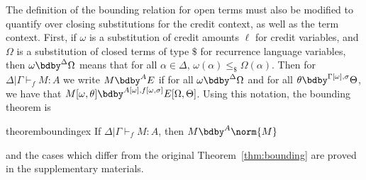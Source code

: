 The definition of the bounding relation for open terms must also be modified to quantify over closing substitutions for the credit context, as well as the term context.
First, if $\omega$ is a substitution of credit amounts $\ell$ for credit variables, and $\Omega$ is a substitution of closed terms of type $\$$ for recurrence language variables, then $\omega \bdby^{\Delta} \Omega$ means that for all $\alpha \in \Delta$, $\omega(\alpha) \leq_\$ \Omega(\alpha)$.
Then for $\Delta | \Gamma \vdash_f M : A$ we write $M \bdby^A E$ if for all $\omega \bdby^{\Delta} \Omega$ and for all $\theta \bdby^{\Gamma[\omega],\sigma} \Theta$, we have that $M[\omega,\theta] \bdby^{A[\omega],f[\omega,\sigma]} E[\Omega,\Theta]$.
Using this notation, the bounding theorem is
\begin{restatable}{theorem}{boundingex}
\label{thm:bounding-ex}
If $\Delta | \Gamma \vdash_f M : A$, then $M \bdby^A \norm{M}$
\end{restatable}
\noindent and the cases which differ from the original Theorem~\ref{thm:bounding} are proved in the supplementary materials.


